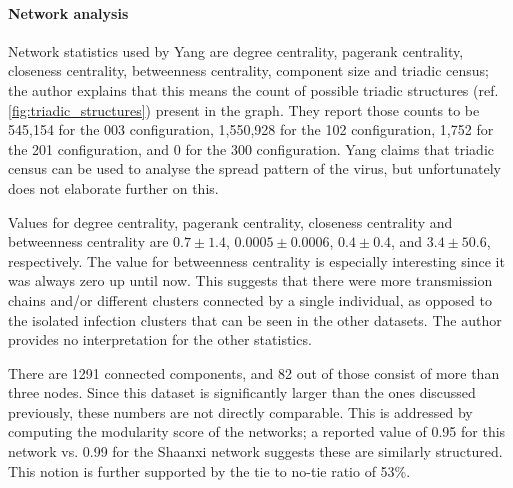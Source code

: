 \paragraph{Network analysis} Network statistics used by Yang are degree centrality, pagerank centrality, closeness centrality, betweenness centrality, component size and triadic census; the author explains that this means the count of possible triadic structures (ref. \ref{fig:triadic_structures}) present in the graph. They report those counts to be 545,154 for the 003 configuration, 1,550,928 for the 102 configuration, 1,752 for the 201 configuration, and 0 for the 300 configuration. Yang claims that triadic census can be used to analyse the spread pattern of the virus, but unfortunately does not elaborate further on this.

Values for degree centrality, pagerank centrality, closeness centrality and betweenness centrality are $0.7\pm1.4$, $0.0005\pm0.0006$, $0.4\pm0.4$, and $3.4\pm50.6$, respectively. The value for betweenness centrality is especially interesting since it was always zero up until now. This suggests that there were more transmission chains and/or different clusters connected by a single individual, as opposed to the isolated infection clusters that can be seen in the other datasets. The author provides no interpretation for the other statistics.

There are 1291 connected components, and 82 out of those consist of more than three nodes. Since this dataset is significantly larger than the ones discussed previously, these numbers are not directly comparable. This is addressed by computing the modularity score of the networks; a reported value of 0.95 for this network vs. 0.99 for the Shaanxi network suggests these are similarly structured. This notion is further supported by the tie to no-tie ratio of 53\%.

